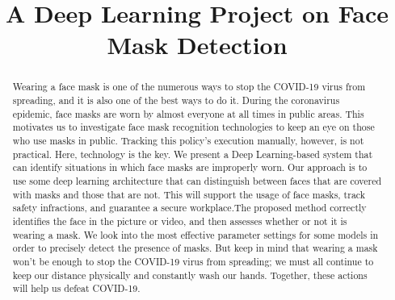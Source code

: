 \documentclass[conference]{IEEEtran}
\begin{document}
\title{A Deep Learning Project on Face Mask Detection\\}

\author{
\and
{}
\and
{}
\and
{}
}

\maketitle

\begin{abstract}
Wearing a face mask is one of the numerous ways to stop the COVID-19 virus from spreading, and it is also one of the best ways to do it. During the coronavirus epidemic, face masks are worn by almost everyone at all times in public areas. This motivates us to investigate face mask recognition technologies to keep an eye on those who use masks in public. Tracking this policy's execution manually, however, is not practical. Here, technology is the key. We present a Deep Learning-based system that can identify situations in which face masks are improperly worn. Our approach is to use some deep learning architecture that can distinguish between faces that are covered with masks and those that are not. This will support the usage of face masks, track safety infractions, and guarantee a secure workplace.The proposed method correctly identifies the face in the picture or video, and then assesses whether or not it is wearing a mask. We look into the most effective parameter settings for some models in order to precisely detect the presence of masks. But keep in mind that wearing a mask won't be enough to stop the COVID-19 virus from spreading; we must all continue to keep our distance physically and constantly wash our hands. Together, these actions will help us defeat COVID-19.
\end{abstract}
\end{document}
